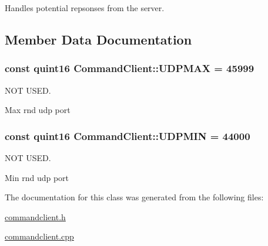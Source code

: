 \-Handles potential repsonses from the server. 



\subsection{\-Member \-Data \-Documentation}
\hypertarget{class_command_client_aad85b9fd20a7256920ec58ebbdc4534b}{
\subsubsection[{\-U\-D\-P\-M\-A\-X}]{\setlength{\rightskip}{0pt plus 5cm}const quint16 {\bf \-Command\-Client\-::\-U\-D\-P\-M\-A\-X} = 45999}}
\label{class_command_client_aad85b9fd20a7256920ec58ebbdc4534b}


\-N\-O\-T \-U\-S\-E\-D. 

\-Max rnd udp port \hypertarget{class_command_client_a93ee4eb59cb333a129a142a25ac51390}{
\subsubsection[{\-U\-D\-P\-M\-I\-N}]{\setlength{\rightskip}{0pt plus 5cm}const quint16 {\bf \-Command\-Client\-::\-U\-D\-P\-M\-I\-N} = 44000}}
\label{class_command_client_a93ee4eb59cb333a129a142a25ac51390}


\-N\-O\-T \-U\-S\-E\-D. 

\-Min rnd udp port 

\-The documentation for this class was generated from the following files\-:\begin{DoxyCompactItemize}
\item 
\hyperlink{commandclient_8h}{commandclient.\-h}\item 
\hyperlink{commandclient_8cpp}{commandclient.\-cpp}\end{DoxyCompactItemize}
